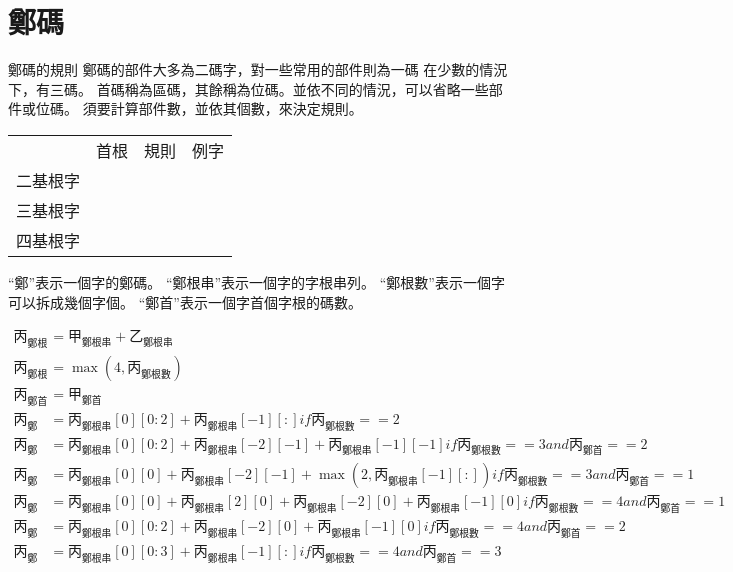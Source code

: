 \documentclass{article}
\begin{document}
\section{鄭碼}
鄭碼的規則
鄭碼的部件大多為二碼字，對一些常用的部件則為一碼
在少數的情況下，有三碼。
首碼稱為區碼，其餘稱為位碼。並依不同的情況，可以省略一些部件或位碼。
須要計算部件數，並依其個數，來決定規則。

\begin{tabular}{llll}
           & 首根 & 規則 & 例字\\
  二基根字 & \\
  三基根字 & \\
  四基根字 & \\
\end{tabular}
``鄭''表示一個字的鄭碼。
``鄭根串''表示一個字的字根串列。
``鄭根數''表示一個字可以拆成幾個字個。
``鄭首''表示一個字首個字根的碼數。

\begin{subequations}
  \begin{align}
  \mbox{丙}_{\mbox{鄭根串}} &= \mbox{甲}_{\mbox{鄭根串}} + \mbox{乙}_{\mbox{鄭根串}} \\
  \mbox{丙}_{\mbox{鄭根數}} &= \max(4, \mbox{丙}_{\mbox{鄭根數}} )\\
  \mbox{丙}_{\mbox{鄭首}} &= \mbox{甲}_{\mbox{鄭首}}\\
  \mbox{丙}_{\mbox{鄭}} &= \mbox{丙}_{\mbox{鄭根串}}[0][0:2]+\mbox{丙}_{\mbox{鄭根串}}[-1][:]
      if \mbox{丙}_{\mbox{鄭根數}}==2 \\
  \mbox{丙}_{\mbox{鄭}} &=
      \mbox{丙}_{\mbox{鄭根串}}[0][0:2]
      +\mbox{丙}_{\mbox{鄭根串}}[-2][-1]
      +\mbox{丙}_{\mbox{鄭根串}}[-1][-1]
      if \mbox{丙}_{\mbox{鄭根數}}==3 and \mbox{丙}_{\mbox{鄭首}}==2 \\
  \mbox{丙}_{\mbox{鄭}} &=
      \mbox{丙}_{\mbox{鄭根串}}[0][0]
      +\mbox{丙}_{\mbox{鄭根串}}[-2][-1]
      +\max(2, \mbox{丙}_{\mbox{鄭根串}}[-1][:])
      if \mbox{丙}_{\mbox{鄭根數}}==3 and \mbox{丙}_{\mbox{鄭首}}==1 \\
  \mbox{丙}_{\mbox{鄭}} &= \mbox{丙}_{\mbox{鄭根串}}[0][0]
      + \mbox{丙}_{\mbox{鄭根串}}[2][0]
      + \mbox{丙}_{\mbox{鄭根串}}[-2][0]
      + \mbox{丙}_{\mbox{鄭根串}}[-1][0]
      if \mbox{丙}_{\mbox{鄭根數}}==4 and \mbox{丙}_{\mbox{鄭首}}==1\\
  \mbox{丙}_{\mbox{鄭}} &= \mbox{丙}_{\mbox{鄭根串}}[0][0:2]
      + \mbox{丙}_{\mbox{鄭根串}}[-2][0]
      + \mbox{丙}_{\mbox{鄭根串}}[-1][0]
      if \mbox{丙}_{\mbox{鄭根數}}==4 and \mbox{丙}_{\mbox{鄭首}}==2\\
  \mbox{丙}_{\mbox{鄭}} &= \mbox{丙}_{\mbox{鄭根串}}[0][0:3]+\mbox{丙}_{\mbox{鄭根串}}[-1][:]
      if \mbox{丙}_{\mbox{鄭根數}}==4 and \mbox{丙}_{\mbox{鄭首}}==3\\
  \end{align}
\end{subequations}
\end{document}
